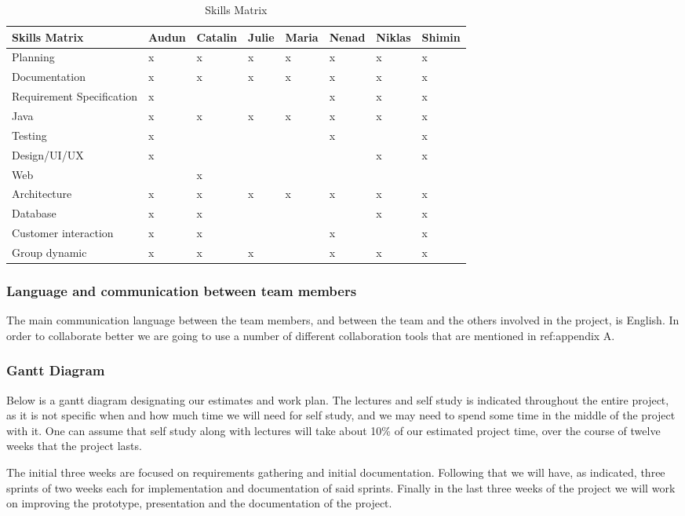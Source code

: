 \documentclass[../document.tex]{subfiles}
\begin{document}
\begin{table}[H]
\caption{Skills Matrix}
\begin{tabularx}{\textwidth}{|X|l|l|l|l|l|l|l|}
\hline
Skills Matrix
&Audun
&Catalin
&Julie
&Maria
&Nenad
&Niklas
&Shimin
\\ \hline Planning
&x
&x
&x
&x
&x
&x
&x
\\ \hline Documentation
&x
&x
&x
&x
&x
&x
&x
\\ \hline Requirement Specification
&x
&
&
&
&x
&x
&x
\\ \hline Java
&x
&x
&x
&x
&x
&x
&x
\\ \hline Testing
&x
&
&
&
&x
&
&x
\\ \hline Design/UI/UX
&x
&
&
&
&
&x
&x
\\ \hline Web
&
&x
&
&
&
&
&
\\ \hline Architecture
&x
&x
&x
&x
&x
&x
&x
\\ \hline Database
&x
&x
&
&
&
&x
&x
\\ \hline Customer interaction
&x
&x
&
&
&x
&
&x
\\ \hline Group dynamic
&x
&x
&x
&
&x
&x
&x
\\ \hline
\end{tabularx}
\end{table}

\subsubsection{Language and communication between team members}
The main communication language between the team members, and between the team and the others involved in the project, is English. In order to collaborate better we are going to use a number of different collaboration tools that are mentioned in {\color{red} ref:}appendix A.

\subsubsection{Gantt Diagram}
Below is a gantt diagram designating our estimates and work plan. The lectures and self study is indicated throughout the entire project, as it is not specific when and how much time we will need for self study, and we may need to spend some time in the middle of the project with it. One can assume that self study along with lectures will take about 10\% of our estimated project time, over the course of twelve weeks that the project lasts.

The initial three weeks are focused on requirements gathering and initial documentation. Following that we will have, as indicated, three sprints of two weeks each for implementation and documentation of said sprints. Finally in the last three weeks of the project we will work on improving the prototype, presentation and the documentation of the project.
\end{document}
